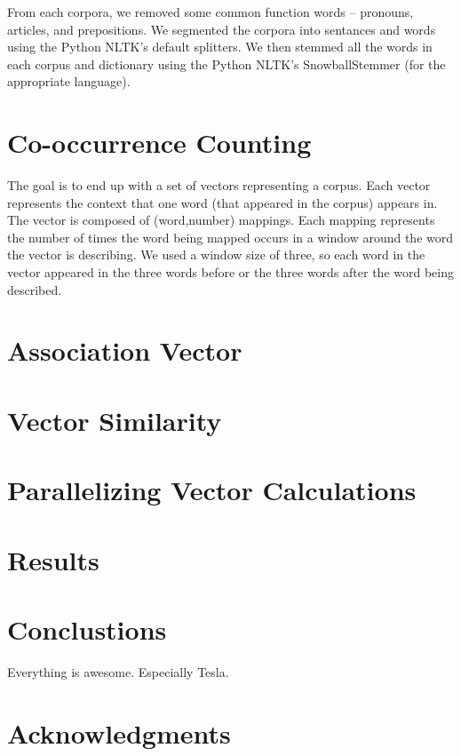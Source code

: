 \documentclass[12pt]{article}
\begin{document}
From each corpora, we removed some common function words -- pronouns,
articles, and prepositions. We segmented the corpora into sentances and words
using the Python NLTK's default splitters. We then stemmed all the words in
each corpus and dictionary using the Python NLTK's SnowballStemmer (for the
appropriate language).

\section{Co-occurrence Counting}


The goal is to end up with a set of vectors representing a corpus. Each vector
represents the context that one word (that appeared in the corpus) appears in.
The vector is composed of (word,number) mappings. Each mapping represents the
number of times the word being mapped occurs in a window around the word the
vector is describing. We used a window size of three, so each word in the
vector appeared in the three words before or the three words after the word
being described.

\section{Association Vector}

\section{Vector Similarity}

\section{Parallelizing Vector Calculations}

\section{Results}

\section{Conclustions}
Everything is awesome. Especially Tesla.

\section{Acknowledgments}

\end{document}
